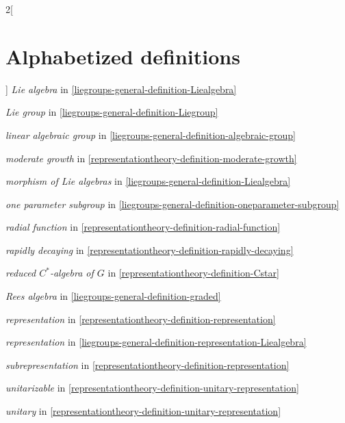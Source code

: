 \begin{multicols}{2}[\section{Alphabetized definitions}\label{section-alphabetized}]
\noindent
{\it Lie algebra}
in \ref{liegroups-general-definition-Liealgebra}

\noindent
{\it Lie group}
in \ref{liegroups-general-definition-Liegroup}

\noindent
{\it linear algebraic group}
in \ref{liegroups-general-definition-algebraic-group}

\noindent
{\it moderate growth}
in \ref{representationtheory-definition-moderate-growth}

\noindent
{\it morphism of Lie algebras}
in \ref{liegroups-general-definition-Liealgebra}

\noindent
{\it one parameter subgroup}
in \ref{liegroups-general-definition-oneparameter-subgroup}

\noindent
{\it radial function}
in \ref{representationtheory-definition-radial-function}

\noindent
{\it rapidly decaying}
in \ref{representationtheory-definition-rapidly-decaying}

\noindent
{\it reduced $C^*$-algebra of $G$}
in \ref{representationtheory-definition-Cstar}

\noindent
{\it Rees algebra}
in \ref{liegroups-general-definition-graded}

\noindent
{\it representation}
in \ref{representationtheory-definition-representation}

\noindent
{\it representation}
in \ref{liegroups-general-definition-representation-Liealgebra}

\noindent
{\it subrepresentation}
in \ref{representationtheory-definition-representation}

\noindent
{\it unitarizable}
in \ref{representationtheory-definition-unitary-representation}

\noindent
{\it unitary}
in \ref{representationtheory-definition-unitary-representation}

\end{multicols}

